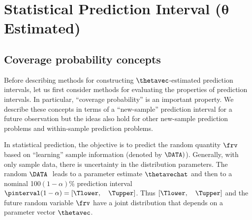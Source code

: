 \section{Statistical Prediction Interval ($\boldsymbol{\theta} $ Estimated)}
\label{section:stat.pred}
\subsection{Coverage probability concepts}
\label{section:pi.coverage.prob}
Before describing methods for constructing $\thetavec$-estimated
prediction intervals, let us first consider methods for evaluating
the properties of prediction intervals. In particular, ``coverage
probability'' is an important property.  We describe these concepts
in terms of a ``new-sample'' prediction interval for a
future observation but the ideas also hold for other new-sample
prediction problems and within-sample prediction problems.
 
In statistical prediction, the objective is to predict the random
quantity $\frv$ based on ``learning'' sample information (denoted by
$\DATA)$).  Generally, with only sample data, there is uncertainty
in the distribution parameters. The random $\DATA~$ leads to a
parameter estimate $\thetavechat$ and then to a nominal
100$(1-\alpha)$\% prediction interval
$\pinterval(1-\alpha)=[\Tlower,\quad \Tupper ]$.  Thus $[\Tlower,
\quad \Tupper ]$ and the future random variable $\frv$ have a joint
distribution that depends on a parameter vector $\thetavec$.

